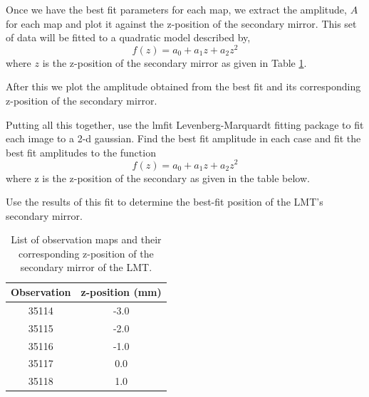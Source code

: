 Once we have the best fit parameters for each map, we extract the amplitude, $A$ for each map and plot it against the z-position of the secondary mirror. This set of data will be fitted to a quadratic model described by,
\begin{equation}
    f(z)=a_0+a_1z+a_2z^2
\end{equation}
where $z$ is the z-position of the secondary mirror as given in Table \ref{tab:LMTmaps}. 

After this we plot the amplitude obtained from the best fit and its corresponding z-position of the secondary mirror. 


Putting all this together, use the lmfit Levenberg-Marquardt fitting package to fit each image to a 2-d gaussian. 
Find the best fit amplitude in each case and fit the best fit amplitudes to the function
\begin{equation}
    f(z)=a_0+a_1z+a_2z^2
\end{equation}
where z is the z-position of the secondary as given in the table below.

Use the results of this
fit to determine the best-fit position of the LMT's secondary mirror.

\begin{table}[h]
    \centering
    \begin{tabular}{|c|c|}
        \toprule
         Observation  & z-position (mm)  \\
         \midrule
         35114 & -3.0\\
         35115 & -2.0 \\
         35116 & -1.0 \\
         35117 & 0.0 \\
         35118 & 1.0\\
         \bottomrule
    \end{tabular}
    \caption{List of observation maps and their corresponding z-position of the secondary mirror of the LMT.}
    \label{tab:LMTmaps}
\end{table}

